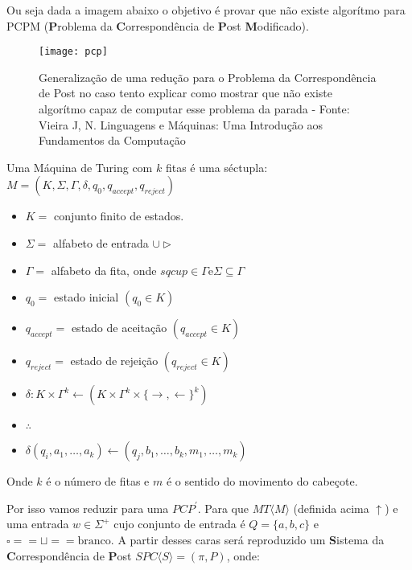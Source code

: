 \documentclass[12pt, a4paper]{article}
\begin{document}
\qquad Ou seja dada a imagem abaixo o objetivo é provar que não existe algorítmo para PCPM (\textbf{P}roblema da \textbf{C}orrespondência de \textbf{P}ost \textbf{M}odificado).

\begin{center}
\begin{figure}[ht]
\texttt{[image: pcp]}
\caption[Redução do PCP]{Generalização de uma redução para o Problema da Correspondência de Post no caso tento explicar como mostrar que não existe algorítmo capaz de computar esse problema da parada - Fonte: Vieira J, N. Linguagens e Máquinas: Uma Introdução aos Fundamentos da Computação}
\end{figure}
\end{center}

\pagebreak


Uma Máquina de Turing com $k$ fitas é uma séctupla: $M = ( K, \Sigma , \Gamma , \delta, q_{0}, q_{accept}, q_{reject})$

\begin{itemize}
\item $K =$ conjunto finito de estados.
\item $\Sigma =$ alfabeto de entrada $\cup{\triangleright}$
\item $\Gamma = $ alfabeto da fita, onde $sqcup  \in \Gamma \text{e} \Sigma \subseteq \Gamma$
\item $q_{0} = $ estado inicial $(q_{0} \in K)$
\item $q_{accept} = $ estado de aceitação $(q_{accept} \in K)$
\item$q_{reject} = $ estado de rejeição $(q_{reject} \in K)$
\item$\delta : K \times \Gamma^{k} \leftarrow (K \times \Gamma^{k} \times {\lbrace \rightarrow, \leftarrow \rbrace}^{k})$
\item $\therefore$
\item $\delta(q_{i}, a_{1}, \ldots , a_{k}) \leftarrow (q_{j}, b_{1}, \ldots, b_{k}, m_{1}, \ldots, m_{k})$
\end{itemize}

\qquad Onde $k$ é o número de fitas e $m$ é o sentido do movimento do cabeçote.

\qquad Por isso vamos reduzir para uma $PCP^{'}$. Para que $MT \langle M \rangle$ (definida acima $\uparrow$) e uma entrada $w \in \Sigma^{+}$ cujo conjunto de entrada é $Q = \lbrace a, b, c \rbrace $ e $\square == \sqcup ==  \text{branco}$. A partir desses caras será reproduzido um \textbf{S}istema da \textbf{C}orrespondência de \textbf{P}ost $SPC \langle S \rangle = (\pi, P)$, onde:
\end{document}
